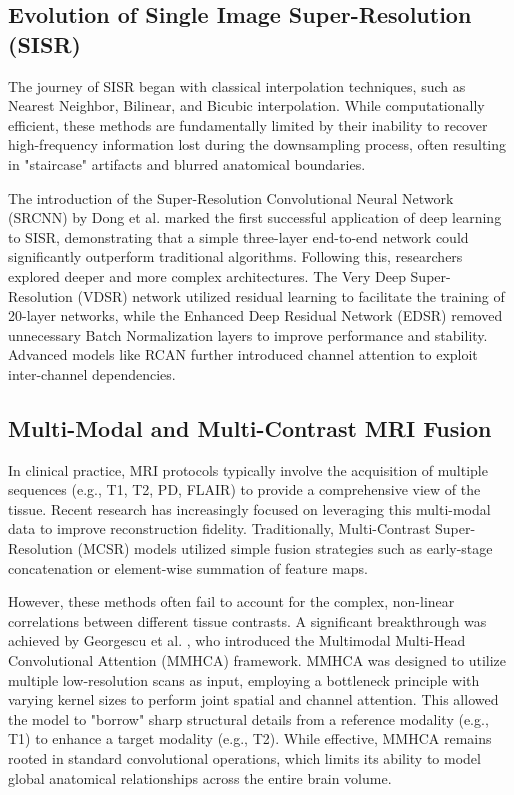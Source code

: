 \documentclass{IEEEoj}
\begin{document}
\subsection{Evolution of Single Image Super-Resolution (SISR)}
The journey of SISR began with classical interpolation techniques, such as Nearest Neighbor, Bilinear, and Bicubic interpolation. While computationally efficient, these methods are fundamentally limited by their inability to recover high-frequency information lost during the downsampling process, often resulting in "staircase" artifacts and blurred anatomical boundaries. 

The introduction of the Super-Resolution Convolutional Neural Network (SRCNN) \cite{srcnn} by Dong et al. marked the first successful application of deep learning to SISR, demonstrating that a simple three-layer end-to-end network could significantly outperform traditional algorithms. Following this, researchers explored deeper and more complex architectures. The Very Deep Super-Resolution (VDSR) network utilized residual learning to facilitate the training of 20-layer networks, while the Enhanced Deep Residual Network (EDSR) \cite{edsr} removed unnecessary Batch Normalization layers to improve performance and stability. Advanced models like RCAN \cite{rcan} further introduced channel attention to exploit inter-channel dependencies.

\subsection{Multi-Modal and Multi-Contrast MRI Fusion}
In clinical practice, MRI protocols typically involve the acquisition of multiple sequences (e.g., T1, T2, PD, FLAIR) to provide a comprehensive view of the tissue. Recent research has increasingly focused on leveraging this multi-modal data to improve reconstruction fidelity. Traditionally, Multi-Contrast Super-Resolution (MCSR) models utilized simple fusion strategies such as early-stage concatenation or element-wise summation of feature maps. 

However, these methods often fail to account for the complex, non-linear correlations between different tissue contrasts. A significant breakthrough was achieved by Georgescu et al. \cite{Georgescu2023}, who introduced the Multimodal Multi-Head Convolutional Attention (MMHCA) framework. MMHCA was designed to utilize multiple low-resolution scans as input, employing a bottleneck principle with varying kernel sizes to perform joint spatial and channel attention. This allowed the model to "borrow" sharp structural details from a reference modality (e.g., T1) to enhance a target modality (e.g., T2). While effective, MMHCA remains rooted in standard convolutional operations, which limits its ability to model global anatomical relationships across the entire brain volume.
\end{document}
